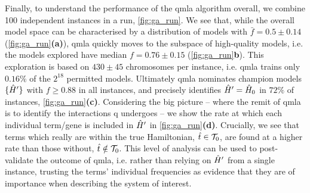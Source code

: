 {Finally, to understand the performance of the \gls{qmla} algorithm overall, 
    we combine 100 independent \glspl{instance} in a \gls{run}, \cref{fig:ga_run}. 
We see that, while the overall \gls{model space} can be characterised by a distribution 
    of models with $\bar{f} = 0.5 \pm 0.14$ (\cref{fig:ga_run}\textbf{(a)}), 
    \gls{qmla} quickly moves to the subspace of high-quality models, 
    i.e. the models explored have median $f = 0.76 \pm 0.15$ (\cref{fig:ga_run}\textbf{b}).
This exploration is based on $430 \pm 45$ chromosomes per instance, 
    i.e. \gls{qmla} trains only $0.16\%$ of the $2^{18}$ permitted models. 
Ultimately \gls{qmla} nominates \glspl{champion model} $\{ \hat{H}^{\prime} \}$ with $f \geq 0.88$ in all instances, 
    and precisely identifies $\hat{H}^{\prime}=\hat{H}_0$ in $72\%$ of instances, \cref{fig:ga_run}\textbf{(c)}. 
Considering the big picture 
    -- where the remit of \gls{qmla} is to identify the interactions \gls{q} undergoes -- 
    we show the rate at which each individual term/gene is included in $\hat{H}^{\prime}$ in 
    \cref{fig:ga_run}\textbf{(d)}. 
Crucially, we see that terms which really are within the true Hamiltonian, $\hat{t} \in \mathcal{T}_0$, 
    are found at a higher rate than those without, $\hat{t} \notin \mathcal{T}_0$. 
This level of analysis can be used to post-validate the outcome of \gls{qmla}, 
    i.e. rather than relying on $\hat{H}^{\prime}$ from a single instance, 
    trusting the terms' individual frequencies as evidence that they are of importance when describing 
    the system of interest. 
\par 

}
